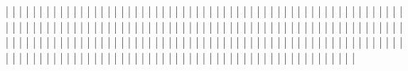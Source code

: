 |           |
|           |
|           |
|           |
|           |
|           |
|           |
|           |
|           |
|           |
|           |
|           |
|           |
|           |
|           |
|           |
|           |
|           |
|           |
|           |
|           |
|           |
|           |
|           |
|           |
|           |
|           |
|           |
|           |
|           |
|           |
|           |
|           |
|           |
|           |
|           |
|           |
|           |
|           |
|           |
|           |
|           |
|           |
|           |
|           |
|           |
|           |
|           |
|           |
|           |
|           |
|           |
|           |
|           |
|           |
|           |
|           |
|           |
|           |
|           |
|           |
|           |
|           |
|           |
|           |
|           |
|           |
|           |
|           |
|           |
|           |
|           |
|           |
|           |
|           |
|           |
|           |
|           |
|           |
|           |
|           |
|           |
|           |
|           |
|           |
|           |
|           |
|           |
|           |
|           |
|           |
|           |
|           |
|           |
|           |
|           |
|           |
|           |
|           |
|           |
|           |
|           |
|           |
|           |
|           |
|           |
|           |
|           |
|           |
|           |
|           |
|           |
|           |
|           |
|